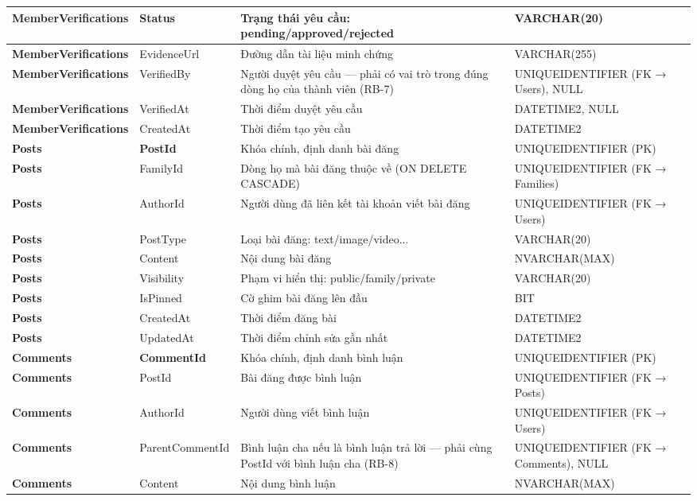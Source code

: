 \begin{longtable}{|p{}|p{}|p{}|p{}|}
\textbf{MemberVerifications} & Status & Trạng thái yêu cầu: pending/approved/rejected & VARCHAR(20) \\ \hline
\textbf{MemberVerifications} & EvidenceUrl & Đường dẫn tài liệu minh chứng & VARCHAR(255) \\ \hline
\textbf{MemberVerifications} & VerifiedBy & Người duyệt yêu cầu — phải có vai trò trong đúng dòng họ của thành viên (RB-7) & UNIQUEIDENTIFIER (FK → Users), NULL \\ \hline
\textbf{MemberVerifications} & VerifiedAt & Thời điểm duyệt yêu cầu & DATETIME2, NULL \\ \hline
\textbf{MemberVerifications} & CreatedAt & Thời điểm tạo yêu cầu & DATETIME2 \\ \hline
\textbf{Posts} & \textbf{PostId} & Khóa chính, định danh bài đăng & UNIQUEIDENTIFIER (PK) \\ \hline
\textbf{Posts} & FamilyId & Dòng họ mà bài đăng thuộc về (ON DELETE CASCADE) & UNIQUEIDENTIFIER (FK → Families) \\ \hline
\textbf{Posts} & AuthorId & Người dùng đã liên kết tài khoản viết bài đăng & UNIQUEIDENTIFIER (FK → Users) \\ \hline
\textbf{Posts} & PostType & Loại bài đăng: text/image/video... & VARCHAR(20) \\ \hline
\textbf{Posts} & Content & Nội dung bài đăng & NVARCHAR(MAX) \\ \hline
\textbf{Posts} & Visibility & Phạm vi hiển thị: public/family/private & VARCHAR(20) \\ \hline
\textbf{Posts} & IsPinned & Cờ ghim bài đăng lên đầu & BIT \\ \hline
\textbf{Posts} & CreatedAt & Thời điểm đăng bài & DATETIME2 \\ \hline
\textbf{Posts} & UpdatedAt & Thời điểm chỉnh sửa gần nhất & DATETIME2 \\ \hline
\textbf{Comments} & \textbf{CommentId} & Khóa chính, định danh bình luận & UNIQUEIDENTIFIER (PK) \\ \hline
\textbf{Comments} & PostId & Bài đăng được bình luận & UNIQUEIDENTIFIER (FK → Posts) \\ \hline
\textbf{Comments} & AuthorId & Người dùng viết bình luận & UNIQUEIDENTIFIER (FK → Users) \\ \hline
\textbf{Comments} & ParentCommentId & Bình luận cha nếu là bình luận trả lời — phải cùng PostId với bình luận cha (RB-8) & UNIQUEIDENTIFIER (FK → Comments), NULL \\ \hline
\textbf{Comments} & Content & Nội dung bình luận & NVARCHAR(MAX) \\ \hline

\end{longtable}
